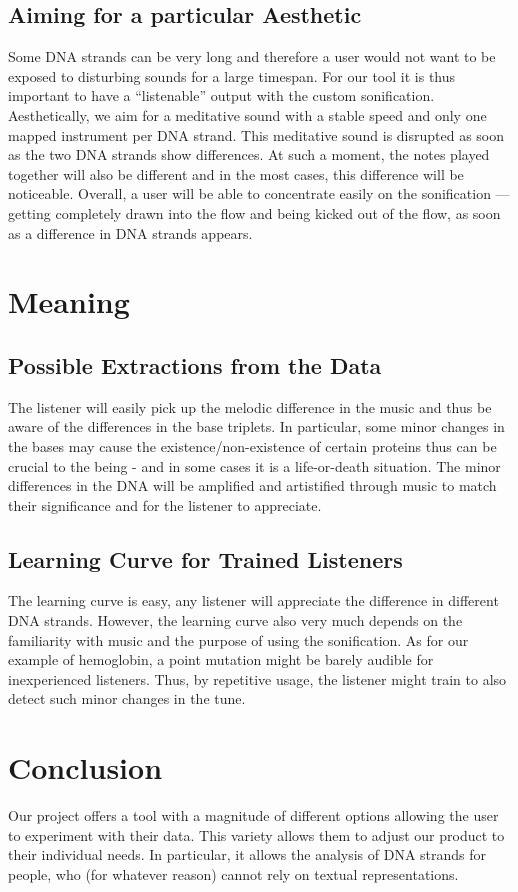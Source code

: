 \documentclass[10pt]{article}
\begin{document}
\subsection{Aiming for a particular Aesthetic}
Some DNA strands can be very long and therefore a user would not want to be 
exposed to disturbing sounds for a large timespan. For our tool it is thus important to have a 
“listenable” output with the custom sonification. Aesthetically, we aim for a meditative sound 
with a stable speed and only one mapped instrument per DNA strand. This meditative sound 
is disrupted as soon as the two DNA strands show differences. At such a moment, the notes 
played together will also be different and in the most cases, this difference will be noticeable. 
Overall, a user will be able to concentrate easily on the sonification — getting completely 
drawn into the flow and being kicked out of the flow, as soon as a difference in DNA strands 
appears.

\section{Meaning}
\subsection{Possible Extractions from the Data}
The listener will easily pick up the melodic difference in the music and thus be aware 
of the differences in the base triplets. In particular, some minor changes in the bases may 
cause the existence/non-existence of certain proteins thus can be crucial to the being - and in 
some cases it is a life-or-death situation. The minor differences in the DNA will be amplified 
and artistified through music to match their significance and for the listener to appreciate.
\subsection{Learning Curve for Trained Listeners}
The learning curve is easy, any listener will appreciate the difference in different DNA 
strands. However, the learning curve also very much depends on the familiarity with music 
and the purpose of using the sonification. As for our example of hemoglobin, a point mutation 
might be barely audible for inexperienced listeners. Thus, by repetitive usage, the listener 
might train to also detect such minor changes in the tune.

\section{Conclusion}
Our project offers a tool with a magnitude of different options allowing the user to 
experiment with their data. This variety allows them to adjust our product to their individual 
needs. In particular, it allows the analysis of DNA strands for people, who (for whatever 
reason) cannot rely on textual representations.

\newpage
\clearpage
\pagestyle{empty}

\nocite{*}
\doublespacing
\printbibliography
\end{document}
